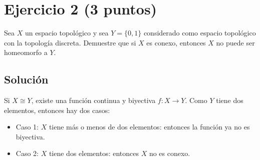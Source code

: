\documentclass{amsbook}
\begin{document}
\section{Ejercicio 2 (3 puntos)}
Sea \(X\) un espacio topológico y sea \(Y = \{ 0,1 \}\) considerado como espacio
topológico con la topología discreta. Demuestre que si \(X\) es conexo, entonces
\(X\) no puede ser homeomorfo a \(Y\).\\
\subsection{Solución}
Si $X \cong Y$, existe una función continua y biyectiva $f: X \to Y$. Como
$Y$ tiene dos elementos, entonces hay dos casos:
\begin{itemize}
	\item Caso 1: $X$ tiene más o menos de dos elementos: entonces la función
		ya no es biyectiva.
	\item Caso 2: $X$ tiene dos elementos: entonces $X$ no es conexo.  
\end{itemize}
\end{document}
